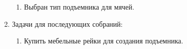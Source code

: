 \begin{enumerate}
\begin{enumerate}
      \item  Выбран тип подъемника для мячей.\newline
    \end{enumerate}
    
	\item Задачи для последующих собраний:\newline
	\begin{enumerate}
	  \item Купить мебельные рейки для создания подъемника.\newline

    \end{enumerate}     
\end{enumerate}

\fillpage
